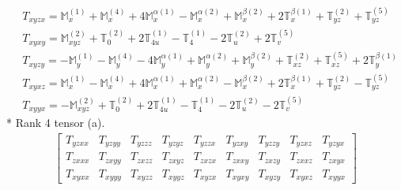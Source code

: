 \documentclass[fleqn,8pt,landscape]{jsarticle}
\begin{document}
\begin{align*}
& T_{xyzx} = \mathbb{M}_{x}^{(1)} + \mathbb{M}_{x}^{(4)} + 4 \mathbb{M}_{x}^{\alpha(1)} - \mathbb{M}_{x}^{\alpha(2)} + \mathbb{M}_{x}^{\beta(2)} + 2 \mathbb{T}_{x}^{\beta(1)} + \mathbb{T}_{yz}^{(2)} + \mathbb{T}_{yz}^{(5)} \\
& T_{xyxy} = \mathbb{M}_{xyz}^{(2)} + \mathbb{T}_{0}^{(2)} + 2 \mathbb{T}_{4u}^{(1)} - \mathbb{T}_{4}^{(1)} - 2 \mathbb{T}_{u}^{(2)} + 2 \mathbb{T}_{v}^{(5)} \\
& T_{xyzy} = - \mathbb{M}_{y}^{(1)} - \mathbb{M}_{y}^{(4)} - 4 \mathbb{M}_{y}^{\alpha(1)} + \mathbb{M}_{y}^{\alpha(2)} + \mathbb{M}_{y}^{\beta(2)} + \mathbb{T}_{xz}^{(2)} + \mathbb{T}_{xz}^{(5)} + 2 \mathbb{T}_{y}^{\beta(1)} \\
& T_{xyxz} = \mathbb{M}_{x}^{(1)} - \mathbb{M}_{x}^{(4)} + 4 \mathbb{M}_{x}^{\alpha(1)} + \mathbb{M}_{x}^{\alpha(2)} - \mathbb{M}_{x}^{\beta(2)} + 2 \mathbb{T}_{x}^{\beta(1)} + \mathbb{T}_{yz}^{(2)} - \mathbb{T}_{yz}^{(5)} \\
& T_{xyyx} = - \mathbb{M}_{xyz}^{(2)} + \mathbb{T}_{0}^{(2)} + 2 \mathbb{T}_{4u}^{(1)} - \mathbb{T}_{4}^{(1)} - 2 \mathbb{T}_{u}^{(2)} - 2 \mathbb{T}_{v}^{(5)}
\end{align*}
* Rank 4 tensor (a).
\begin{align*}
\begin{bmatrix} T_{yzxx} & T_{yzyy} & T_{yzzz} & T_{yzyz} & T_{yzzx} & T_{yzxy} & T_{yzzy} & T_{yzxz} & T_{yzyx} \\ T_{zxxx} & T_{zxyy} & T_{zxzz} & T_{zxyz} & T_{zxzx} & T_{zxxy} & T_{zxzy} & T_{zxxz} & T_{zxyx} \\ T_{xyxx} & T_{xyyy} & T_{xyzz} & T_{xyyz} & T_{xyzx} & T_{xyxy} & T_{xyzy} & T_{xyxz} & T_{xyyx} \end{bmatrix}
\end{align*}
\end{document}
